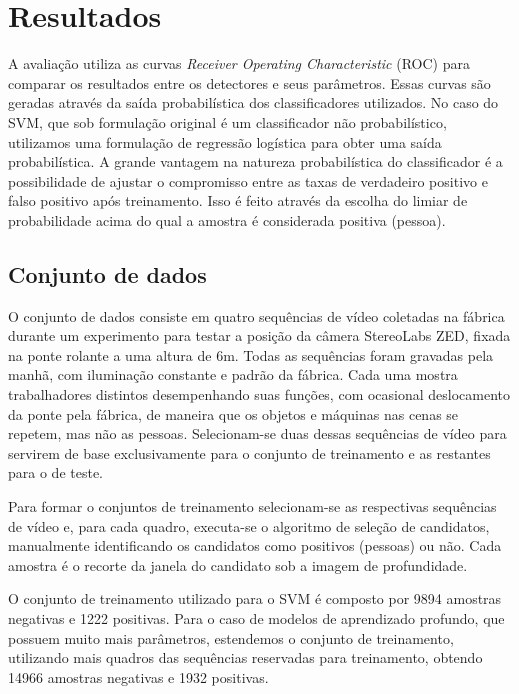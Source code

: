 \section{Resultados}
\label{sec:results}

    A avaliação utiliza as curvas \textit{Receiver Operating Characteristic} (ROC) \cite{evaluationMetrics} para comparar os resultados entre os detectores e seus parâmetros. Essas curvas são geradas através da saída probabilística dos classificadores utilizados. No caso do SVM, que sob formulação original é um classificador não probabilístico, utilizamos uma formulação de regressão logística \cite{svmProbabilisticOutput} para obter uma saída probabilística. A grande vantagem na natureza probabilística do classificador é a possibilidade de ajustar o compromisso entre as taxas de verdadeiro positivo e falso positivo após treinamento. Isso é feito através da escolha do limiar de probabilidade acima do qual a amostra é considerada positiva (pessoa).

\subsection{Conjunto de dados}
    O conjunto de dados consiste em quatro sequências de vídeo coletadas na fábrica durante um experimento para testar a posição da câmera StereoLabs ZED, fixada na ponte rolante a uma altura de 6m. Todas as sequências foram gravadas pela manhã, com iluminação constante e padrão da fábrica. Cada uma mostra trabalhadores distintos desempenhando suas funções, com ocasional deslocamento da ponte pela fábrica, de maneira que os objetos e máquinas nas cenas se repetem, mas não as pessoas. Selecionam-se duas dessas sequências de vídeo para servirem de base exclusivamente para o conjunto de treinamento e as restantes para o de teste.

    Para formar o conjuntos de treinamento selecionam-se as respectivas sequências de vídeo e, para cada quadro, executa-se o algoritmo de seleção de candidatos, manualmente identificando os candidatos como positivos (pessoas) ou não.  Cada amostra é o recorte da janela do candidato sob a imagem de profundidade.

    O conjunto de treinamento utilizado para o SVM é composto por 9894 amostras negativas e 1222 positivas. Para o caso de modelos de aprendizado profundo, que possuem muito mais parâmetros, estendemos o conjunto de treinamento, utilizando mais quadros das sequências reservadas para treinamento, obtendo 14966 amostras negativas e 1932 positivas.

